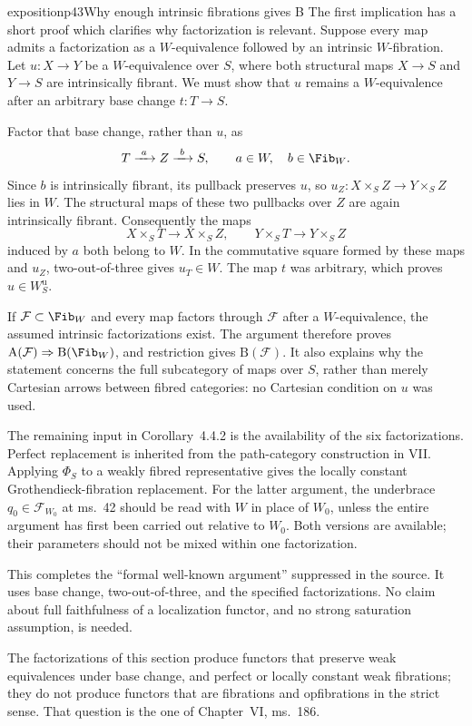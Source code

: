 \begin{dcomment}{exposition}{p43}{Why enough intrinsic fibrations gives B}
The first implication has a short proof which clarifies why factorization is relevant. Suppose every map admits a factorization as a $W$-equivalence followed by an intrinsic $W$-fibration. Let $u:X\to Y$ be a $W$-equivalence over $S$, where both structural maps $X\to S$ and $Y\to S$ are intrinsically fibrant. We must show that $u$ remains a $W$-equivalence after an arbitrary base change $t:T\to S$.

Factor that base change, rather than $u$, as
\[
 T\xrightarrow{\ a\ }Z\xrightarrow{\ b\ }S,
 \qquad a\in W,\quad b\in\Fib_W.
\]
Since $b$ is intrinsically fibrant, its pullback preserves $u$, so $u_Z:X\times_SZ\to Y\times_SZ$ lies in $W$. The structural maps of these two pullbacks over $Z$ are again intrinsically fibrant. Consequently the maps
\[
 X\times_ST\longrightarrow X\times_SZ,
 \qquad Y\times_ST\longrightarrow Y\times_SZ
\]
induced by $a$ both belong to $W$. In the commutative square formed by these maps and $u_Z$, two-out-of-three gives $u_T\in W$. The map $t$ was arbitrary, which proves $u\in W_S^{\mathrm u}$.

If $\mathcal F\subset\Fib_W$ and every map factors through $\mathcal F$ after a $W$-equivalence, the assumed intrinsic factorizations exist. The argument therefore proves $\mathrm A(\mathcal F)\Rightarrow\mathrm B(\Fib_W)$, and restriction gives $\mathrm B(\mathcal F)$. It also explains why the statement concerns the full subcategory of maps over $S$, rather than merely Cartesian arrows between fibred categories: no Cartesian condition on $u$ was used.

The remaining input in Corollary~4.4.2 is the availability of the six factorizations. Perfect replacement is inherited from the path-category construction in VII. Applying $\Phi_S$ to a weakly fibred representative gives the locally constant Grothendieck-fibration replacement. For the latter argument, the underbrace $q_0\in\mathcal F_{W_0}$ at ms.~42 should be read with $W$ in place of $W_0$, unless the entire argument has first been carried out relative to $W_0$. Both versions are available; their parameters should not be mixed within one factorization.

This completes the ``formal well-known argument'' suppressed in the source. It uses base change, two-out-of-three, and the specified factorizations. No claim about full faithfulness of a localization functor, and no strong saturation assumption, is needed.

The factorizations of this section produce functors that preserve weak equivalences under base change, and perfect or locally constant weak fibrations; they do not produce functors that are fibrations and opfibrations in the strict sense. That question is the one of Chapter~VI, ms.~186.
\end{dcomment}

